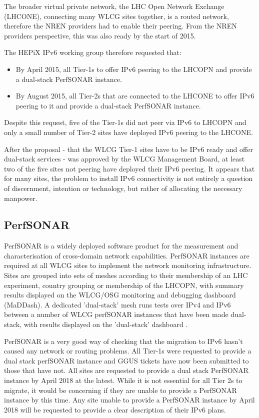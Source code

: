\documentclass[a4paper]{jpconf}
\begin{document}
The broader virtual private network, the LHC Open Network Exchange (LHCONE), connecting many WLCG sites together, is a routed network,
therefore the NREN providers had to enable their peering. From the NREN providers perspective, this was also ready by the start of 2015.  

The HEPiX IPv6 working group therefore requested that:
\begin{itemize}
\item By April 2015, all Tier-1s to offer IPv6 peering to the LHCOPN and provide
  a dual-stack PerfSONAR instance.
\item By August 2015, all Tier-2s that are connected to the LHCONE to offer IPv6 peering to it and provide
  a dual-stack PerfSONAR instance.
\end{itemize}
Despite this request, five of the Tier-1s did not peer via IPv6 to LHCOPN and only a small 
number of Tier-2 sites have deployed IPv6 peering to the LHCONE.

After the proposal - that the WLCG Tier-1 sites have to be IPv6 ready and offer dual-stack services -
was approved by the WLCG Management Board, at least two of the five sites not peering have deployed
their IPv6 peering.  It appears that for many sites, the problem to install IPv6 connectivity is not entirely a question of discernment,
intention or technology, but rather of allocating the necessary manpower.

\subsection{PerfSONAR}
PerfSONAR is a widely deployed software product for the measurement and characterisation of cross-domain network capabilities. PerfSONAR instances are required at all WLCG sites to implement the network monitoring infrastructure. Sites are grouped into sets of meshes according to their membership of an LHC experiment, country grouping or membership of the LHCOPN, with summary results displayed on the WLCG/OSG monitoring and debugging dashboard (MaDDash). A dedicated 'dual-stack' mesh runs tests over IPv4 and IPv6 between a number of WLCG perfSONAR instances that have been made dual-stack, with results displayed on the 'dual-stack' dashboard \cite{PerfSONAR}. 

PerfSONAR is a very good way of checking that the migration to IPv6 hasn't caused any network or routing problems. All Tier-1s were requested to provide a dual stack perfSONAR instance and GGUS tickets have now been submitted to those that have not. All sites are requested to provide a dual stack PerfSONAR instance by April 2018 at the latest. While it is not essential for all Tier 2s to migrate, it would be concerning if they are unable to provide a PerfSONAR instance by this time. Any site unable to provide a PerfSONAR instance by April 2018 will be requested to provide a clear description of their IPv6 plans.
\end{document}
